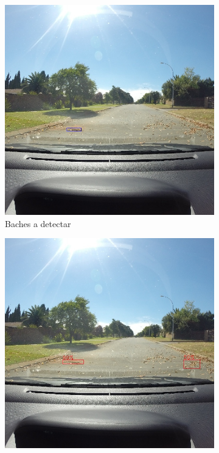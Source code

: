 \begin{figure}[H]
	\centering
	\begin{subfigure}[h]{0.45\linewidth}
		\includegraphics[width=\linewidth]{images/results_f_gt.jpg}
		\caption{Baches a detectar}
	\end{subfigure}
	\begin{subfigure}[h]{0.45\linewidth}
		\includegraphics[width=\linewidth]{images/results_f_yolo_v3_256.jpg}

\end{subfigure}
\end{figure}

